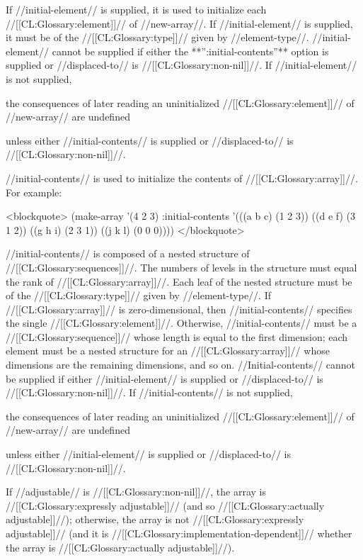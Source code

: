 If //initial-element// is supplied, it is used to initialize each //[[CL:Glossary:element]]// of //new-array//. If //initial-element// is supplied, it must be of the //[[CL:Glossary:type]]// given by //element-type//. //initial-element// cannot be supplied if either the **'':initial-contents''** option is supplied or //displaced-to// is //[[CL:Glossary:non-nil]]//. If //initial-element// is not supplied,

the consequences of later reading an uninitialized //[[CL:Glossary:element]]// of //new-array// are undefined

unless either //initial-contents// is supplied or //displaced-to// is //[[CL:Glossary:non-nil]]//.

//initial-contents// is used to initialize the contents of //[[CL:Glossary:array]]//. For example:

<blockquote> (make-array '(4 2 3) :initial-contents '(((a b c) (1 2 3)) ((d e f) (3 1 2)) ((g h i) (2 3 1)) ((j k l) (0 0 0)))) </blockquote>

//initial-contents// is composed of a nested structure of //[[CL:Glossary:sequences]]//. The numbers of levels in the structure must equal the rank of //[[CL:Glossary:array]]//. Each leaf of the nested structure must be of the //[[CL:Glossary:type]]// given by //element-type//. If //[[CL:Glossary:array]]// is zero-dimensional, then //initial-contents// specifies the single //[[CL:Glossary:element]]//. Otherwise, //initial-contents// must be a //[[CL:Glossary:sequence]]// whose length is equal to the first dimension; each element must be a nested structure for an //[[CL:Glossary:array]]// whose dimensions are the remaining dimensions, and so on. //Initial-contents// cannot be supplied if either //initial-element// is supplied or //displaced-to// is //[[CL:Glossary:non-nil]]//. If //initial-contents// is not supplied,

the consequences of later reading an uninitialized //[[CL:Glossary:element]]// of //new-array// are undefined

unless either //initial-element// is supplied or //displaced-to// is //[[CL:Glossary:non-nil]]//.

If //adjustable// is //[[CL:Glossary:non-nil]]//, the array is //[[CL:Glossary:expressly adjustable]]// (and so //[[CL:Glossary:actually adjustable]]//); otherwise, the array is not //[[CL:Glossary:expressly adjustable]]// (and it is //[[CL:Glossary:implementation-dependent]]// whether the array is //[[CL:Glossary:actually adjustable]]//).


